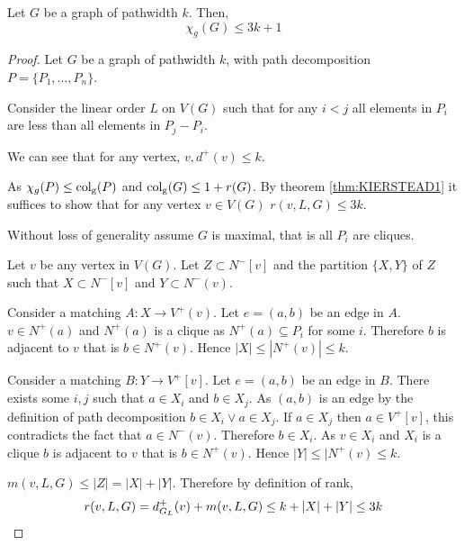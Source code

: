 \begin{theorem}\label{thm_pathwidth}
    Let $G$ be a graph of pathwidth $k$. Then, 
    \[\chi_g(G) \leq 3k + 1\]    
\end{theorem}

\begin{proof}
    Let $G$ be a graph of pathwidth $k$, with path decomposition $P=\{P_1,\dots,P_n\}$. 

    Consider the linear order $L$ on $V(G)$ such that for any $i<j$ all elements in $P_i$ are less than all elements in $P_j - P_i$.  
        
    
    We can see that for any vertex, $v, d^+(v) \leq k$. %
    
    As $\chi_g(P) \leq{\operatorname{col_g}}(P)$ and $\operatorname{col_g}(G)\leq 1+r(G)$. By theorem \ref{thm:KIERSTEAD1} it suffices to show that for any vertex $v \in V(G)$ $r(v,L,G) \leq 3k$. 
    
    Without loss of generality assume $G$ is maximal, that is all $P_i$ are cliques.
    
    Let $v$ be any vertex in $V(G)$. Let $Z \subset N^-[v]$ and the partition $\{X,Y\}$ of $Z$ such that $X\subset N^-[v]$ and  $Y\subset N^-(v)$. 
    
    Consider a matching $A\colon X \to V^+(v)$. Let $e=(a,b)$ be an edge in $A$. $v\in N^+(a)$ and $N^+(a)$ is a clique as $N^+(a) \subseteq P_i$ for some $i$. Therefore $b$ is adjacent to $v$ that is $b\in N^+(v)$. Hence $|X|\leq|N^+(v)|\leq k$. 
    
    Consider a matching $B\colon Y \to V^+[v]$. Let $e=(a,b)$ be an edge in $B$. %
    There exists some $i,j$ such that $a\in X_i$ and $b\in X_j$. As $(a,b)$ is an edge by the definition of path decomposition $b\in X_i \lor a\in X_j$. If $a \in X_j$ then $a \in V^+[v]$, this contradicts the fact that $a\in N^-(v)$. Therefore $b\in X_i$. As $v\in X_i$ and $X_i$ is a clique $b$ is adjacent to $v$ that is $b\in N^+(v)$. Hence $|Y|\leq|N^+(v)\leq k$.  
    
    $m(v,L,G) \leq |Z| = |X|+|Y|$. Therefore by definition of rank, \[r(v,L,G) = d^+_{G_L}(v) + m(v,L,G) \leq k + |X|+|Y| \leq 3k\qedhere\]
\end{proof}
